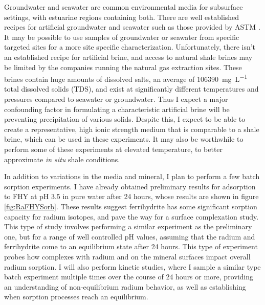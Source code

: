 \documentclass[twoside,12pt,titlepage]{article}
\newcommand{\isotope}[2]{\ch{^{#1}#2}}
\begin{document}
Groundwater and seawater are common environmental media for subsurface settings, with estuarine regions containing both. There are well established recipes for artificial groundwater and seawater such as those provided by ASTM \cite{ASTMSeawater2013}. It may be possible to use samples of groundwater or seawater from specific targeted sites for a more site specific characterization. Unfortunately, there isn't an established recipe for artificial brine, and access to natural shale brines may be limited by the companies running the natural gas extraction sites. These brines contain huge amounts of dissolved salts, an average of \SI{106390}{\milli\gram\per\liter} total dissolved solids (TDS), and exist at significantly different temperatures and pressures compared to seawater or groundwater. Thus I expect a major confounding factor in formulating a characteristic artificial brine will be preventing precipitation of various solids. Despite this, I expect to be able to create a representative, high ionic strength medium that is comparable to a shale brine, which can be used in these experiments. It may also be worthwhile to perform some of these experiments at elevated temperature, to better approximate \textit{in situ} shale conditions.
\par In addition to variations in the media and mineral, I plan to perform a few batch sorption experiments. I have already obtained preliminary results for \isotope{226}{Ra} adsorption to FHY at pH 3.5 in pure water after 24 hours, whose results are shown in figure \ref{fig:RaFHYSorb}. These results suggest ferrihydrite has some significant sorption capacity for radium isotopes, and pave the way for a surface complexation study. This type of study involves performing a similar experiment as the preliminary one, but for a range of well controlled pH values, assuming that the radium and ferrihydrite come to an equilibrium state after 24 hours. This type of experiment probes how complexes with radium and on the mineral surfaces impact overall radium sorption. I will also perform kinetic studies, where I sample a similar type batch experiment multiple times over the course of 24 hours or more, providing an understanding of non-equilibrium radium behavior, as well as establishing when sorption processes reach an equilibrium.
\end{document}
